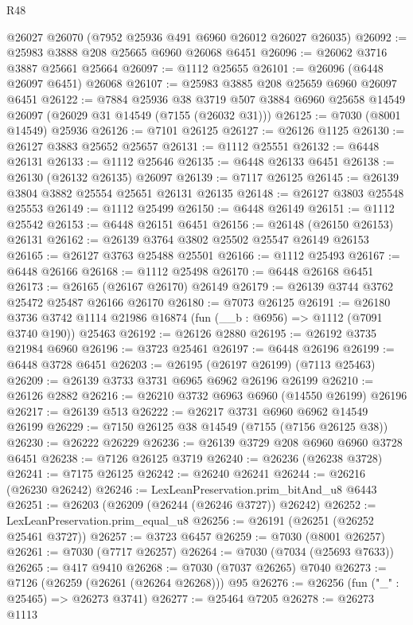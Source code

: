 \begin{lexlean}{R48}
\begin{coremodule}
    @26027
    @26070
    (@7952 @25936 @491 @6960 @26012 @26027 @26035)
@26092 := @25983 @3888 @208 @25665 @6960 @26068 @6451
@26096 := @26062 @3716 @3887 @25661 @25664
@26097 := @1112 @25655
@26101 := @26096 (@6448 @26097 @6451) @26068
@26107 := @25983 @3885 @208 @25659 @6960 @26097 @6451
@26122 := @7884
    @25936
    @38
    @3719
    @507
    @3884
    @6960
    @25658
    @14549
    @26097
    (@26029 @31 @14549 (@7155 (@26032 @31)))
@26125 := @7030 (@8001 @14549) @25936
@26126 := @7101 @26125
@26127 := @26126 @1125
@26130 := @26127 @3883 @25652 @25657
@26131 := @1112 @25551
@26132 := @6448 @26131
@26133 := @1112 @25646
@26135 := @6448 @26133 @6451
@26138 := @26130 (@26132 @26135) @26097
@26139 := @7117 @26125
@26145 := @26139 @3804 @3882 @25554 @25651 @26131 @26135
@26148 := @26127 @3803 @25548 @25553
@26149 := @1112 @25499
@26150 := @6448 @26149
@26151 := @1112 @25542
@26153 := @6448 @26151 @6451
@26156 := @26148 (@26150 @26153) @26131
@26162 := @26139 @3764 @3802 @25502 @25547 @26149 @26153
@26165 := @26127 @3763 @25488 @25501
@26166 := @1112 @25493
@26167 := @6448 @26166
@26168 := @1112 @25498
@26170 := @6448 @26168 @6451
@26173 := @26165 (@26167 @26170) @26149
@26179 := @26139 @3744 @3762 @25472 @25487 @26166 @26170
@26180 := @7073 @26125
@26191 := @26180
    @3736
    @3742
    @1114
    @21986
    @16874
    (fun (__b : @6956) => @1112 (@7091 @3740 @190))
    @25463
@26192 := @26126 @2880
@26195 := @26192 @3735 @21984 @6960
@26196 := @3723 @25461
@26197 := @6448 @26196
@26199 := @6448 @3728 @6451
@26203 := @26195 (@26197 @26199) (@7113 @25463)
@26209 := @26139 @3733 @3731 @6965 @6962 @26196 @26199
@26210 := @26126 @2882
@26216 := @26210 @3732 @6963 @6960 (@14550 @26199) @26196
@26217 := @26139 @513
@26222 := @26217 @3731 @6960 @6962 @14549 @26199
@26229 := @7150 @26125 @38 @14549 (@7155 (@7156 @26125 @38))
@26230 := @26222 @26229
@26236 := @26139 @3729 @208 @6960 @6960 @3728 @6451
@26238 := @7126 @26125 @3719
@26240 := @26236 (@26238 @3728)
@26241 := @7175 @26125
@26242 := @26240 @26241
@26244 := @26216 (@26230 @26242)
@26246 := LexLeanPreservation.prim_bitAnd_u8 @6443
@26251 := @26203 (@26209 (@26244 (@26246 @3727)) @26242)
@26252 := LexLeanPreservation.prim_equal_u8
@26256 := @26191 (@26251 (@26252 @25461 @3727))
@26257 := @3723 @6457
@26259 := @7030 (@8001 @26257)
@26261 := @7030 (@7717 @26257)
@26264 := @7030 (@7034 (@25693 @7633))
@26265 := @417 @9410
@26268 := @7030 (@7037 @26265) @7040
@26273 := @7126 (@26259 (@26261 (@26264 @26268))) @95
@26276 := @26256 (fun ("_" : @25465) => @26273 @3741)
@26277 := @25464 @7205
@26278 := @26273 @1113

\end{coremodule}
\end{lexlean}
